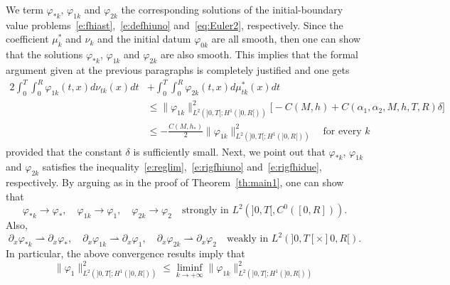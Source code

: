 \documentclass[11pt,leqno]{amsart}
\numberwithin{equation}{section}
\begin{document}
We term ${\varphi}_{\ast k}$, ${\varphi}_{1k}$ and ${\varphi}_{2k}$ the corresponding solutions of the initial-boundary value problems~\eqref{e:fhiast},~\eqref{e:defhiuno} and~\eqref{eq:Euler2}, respectively. Since the coefficient $\mu^\ast_k$ and $\nu_k$ 
and the initial datum ${\varphi}_{0k}$ are all smooth, then one can show that the solutions 
${\varphi}_{\ast k}$, ${\varphi}_{1k}$ and ${\varphi}_{2k}$ are also smooth.  This implies that the formal argument given at the previous paragraphs is completely justified and one gets 
\begin{equation}
\label{e:dovepassoalimite}
\begin{split}
2 \int_0^T  \! \! \! \int_0^R {\varphi}_{1k}(t,x) d\nu_{tk}(x)dt
&  +
   \int_0^T \! \! \! \int_0^R 
   {\varphi}_{2k} (t, x) d \mu^\ast_{tk} (x) dt \\
   & \leq 
   \| {\varphi}_{1k} \|^2_{L^2 (  ]0, T[; H^1 (]0, R[))} 
\Big[ 
- C(M, h) +  C(\alpha_1, \alpha_2, M, h, T, R)  \delta
\Big] \\
& \leq -\frac{C(M, h_\ast)}{2}   \| {\varphi}_{1k} \|^2_{L^2 (  ]0, T[; H^1 (]0, R[))}
 \quad 
   \text{for every $k$}
   \end{split} 
\end{equation}
provided that the constant $\delta$ is sufficiently small. 
Next, we point out that ${\varphi}_{\ast k}$, ${\varphi}_{1k}$ and ${\varphi}_{2k}$ satisfies the inequality~\eqref{e:reglim},~\eqref{e:rigfhiuno} and~\eqref{e:rigfhidue}, respectively. By arguing as in the proof of Theorem~\ref{th:main1}, one can show that 
\begin{equation*}
   {\varphi}_{\ast k} \to {\varphi}_\ast, \quad 
   {\varphi}_{1k} \to {\varphi}_1, \quad 
   {\varphi}_{2k} \to {\varphi}_2 \quad 
   \text{strongly in $L^2 (]0, T[, C^0([0, R]))$.}
\end{equation*}
Also,
\begin{equation*}
   {\partial_x } {\varphi}_{\ast k} {\rightharpoonup} {\partial_x } {\varphi}_\ast, \quad 
   {\partial_x } {\varphi}_{1k} {\rightharpoonup} {\partial_x } {\varphi}_1, \quad 
   {\partial_x } {\varphi}_{2k} {\rightharpoonup} {\partial_x } {\varphi}_2 \quad 
   \text{weakly in $L^2 (]0, T[ \times ]0, R[)$.}
\end{equation*}
In particular, the above convergence results imply that 
\begin{equation}
\label{e:liminf}
  \| {\varphi}_1 \|^2_{L^2 (]0, T[; H^1 (]0, R[)) }
  \leq \liminf_{k \to + \infty}
  \| {\varphi}_{1k} \|^2_{L^2 (]0, T[; H^1 (]0, R[)) }
\end{equation}
\end{document}
